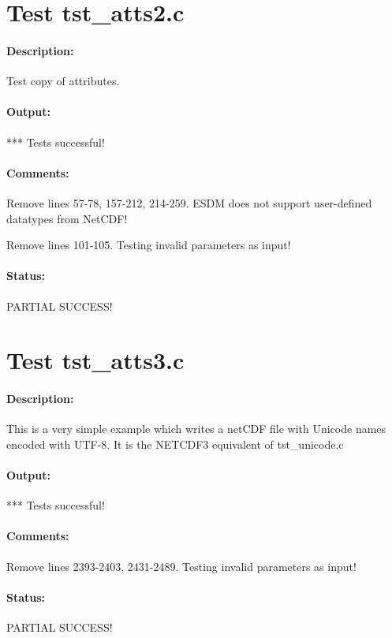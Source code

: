 \section{Test tst\_atts2.c}

\paragraph{Description:} Test copy of attributes.

\paragraph{Output:} *** Tests successful!

\paragraph{Comments:} Remove lines 57-78, 157-212, 214-259. ESDM does not support user-defined datatypes from NetCDF!

Remove lines 101-105. Testing invalid parameters as input!

\paragraph{Status:} PARTIAL SUCCESS!

\section{Test tst\_atts3.c}

\paragraph{Description:} This is a very simple example which writes a netCDF file with
Unicode names encoded with UTF-8. It is the NETCDF3 equivalent
of tst\_unicode.c

\paragraph{Output:} *** Tests successful!

\paragraph{Comments:} Remove lines 2393-2403, 2431-2489. Testing invalid parameters as input!

\paragraph{Status:} PARTIAL SUCCESS!


